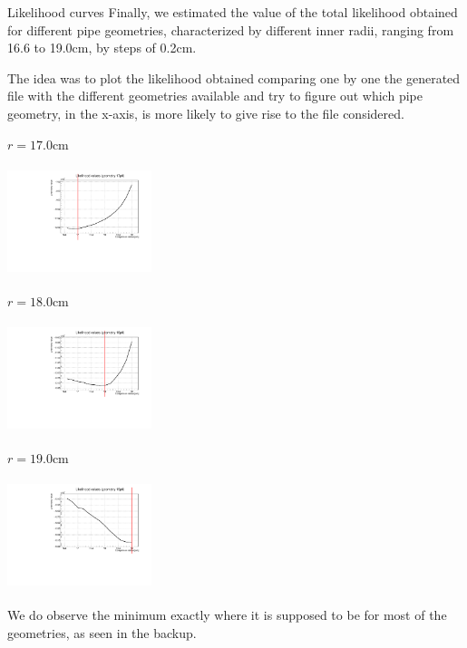\documentclass[8 pt]{beamer}
\begin{document}
\begin{frame}{Likelihood curves}
\justifying
Finally, we estimated the value of the total likelihood obtained for different pipe geometries, characterized by different inner radii, ranging from 16.6 to 19.0cm, by steps of 0.2cm. \vfill

The idea was to plot the likelihood obtained comparing one by one the generated file with the different geometries available and try to figure out which pipe geometry, in the x-axis, is more likely to give rise to the file considered. \vfill

\begin{minipage}[c]{.32\textwidth}
\begin{exampleblock}{} \begin{center}$r = 17.0$cm\end{center} \end{exampleblock}
\includegraphics[width=4.2cm, height=3.2cm]{figs/likelihood100HighStat/likelihood17p0.pdf} 
\end{minipage}
\begin{minipage}[c]{.32\textwidth}
\begin{exampleblock}{} \begin{center}$r = 18.0$cm\end{center} \end{exampleblock}
\includegraphics[width=4.2cm, height=3.2cm]{figs/likelihood100HighStat/likelihood18p0.pdf} 
\end{minipage}
\begin{minipage}[c]{.32\textwidth}
\begin{exampleblock}{} \begin{center}$r = 19.0$cm\end{center} \end{exampleblock}
\includegraphics[width=4.2cm, height=3.2cm]{figs/likelihood100HighStat/likelihood19p0.pdf} 
\end{minipage} \vfill

We do observe the minimum exactly where it is supposed to be for most of the geometries, as seen in the backup. \vfill
\end{frame}
\end{document}
